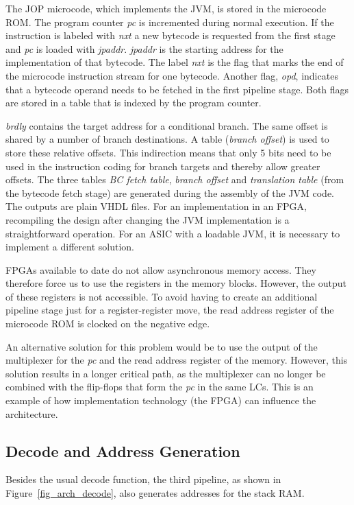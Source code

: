 The JOP microcode, which implements the JVM, is stored in the
microcode ROM. The program counter \emph{pc} is incremented during
normal execution. If the instruction is labeled with \emph{nxt} a
new bytecode is requested from the first stage and \emph{pc} is
loaded with \emph{jpaddr}. \emph{jpaddr} is the starting address for
the implementation of that bytecode. The label \emph{nxt} is the
flag that marks the end of the microcode instruction stream for one
bytecode. Another flag, \emph{opd}, indicates that a bytecode
operand needs to be fetched in the first pipeline stage. Both flags
are stored in a table that is indexed by the program counter.

\emph{brdly} contains the target address for a conditional branch.
The same offset is shared by a number of branch destinations. A
table (\emph{branch offset}) is used to store these relative
offsets. This indirection means that only 5 bits need to be used in
the instruction coding for branch targets and thereby allow greater
offsets. The three tables \emph{BC fetch table}, \emph{branch
offset} and \emph{translation table} (from the bytecode fetch stage)
are generated during the assembly of the JVM code. The outputs are
plain VHDL files. For an implementation in an FPGA, recompiling the
design after changing the JVM implementation is a straightforward
operation. For an ASIC with a loadable JVM, it is necessary to
implement a different solution.

FPGAs available to date do not allow asynchronous memory access.
They therefore force us to use the registers in the memory blocks.
However, the output of these registers is not accessible. To avoid
having to create an additional pipeline stage just for a
register-register move, the read address register of the microcode
ROM is clocked on the negative edge.

An alternative solution for this problem would be to use the output
of the multiplexer for the \emph{pc} and the read address register
of the memory. However, this solution results in a longer critical
path, as the multiplexer can no longer be combined with the
flip-flops that form the \emph{pc} in the same LCs. This is an
example of how implementation technology (the FPGA) can influence
the architecture.

\subsection{Decode and Address Generation}

Besides the usual decode function, the third pipeline, as shown in
Figure~\ref{fig_arch_decode}, also generates addresses for the stack
RAM.


